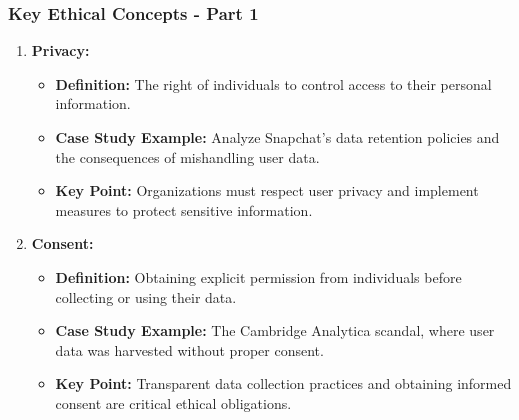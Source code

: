 \documentclass[aspectratio=169]{beamer}
\begin{document}
\begin{frame}[fragile]
    \frametitle{Key Ethical Concepts - Part 1}
    \begin{enumerate}
        \item \textbf{Privacy:}
        \begin{itemize}
            \item \textbf{Definition:} The right of individuals to control access to their personal information.
            \item \textbf{Case Study Example:} Analyze Snapchat's data retention policies and the consequences of mishandling user data.
            \item \textbf{Key Point:} Organizations must respect user privacy and implement measures to protect sensitive information.
        \end{itemize}

        \item \textbf{Consent:}
        \begin{itemize}
            \item \textbf{Definition:} Obtaining explicit permission from individuals before collecting or using their data.
            \item \textbf{Case Study Example:} The Cambridge Analytica scandal, where user data was harvested without proper consent.
            \item \textbf{Key Point:} Transparent data collection practices and obtaining informed consent are critical ethical obligations.
        \end{itemize}
    \end{enumerate}
\end{frame}
\end{document}
